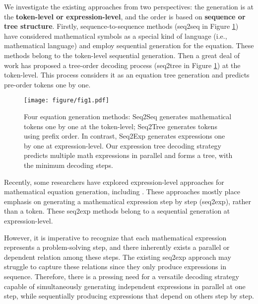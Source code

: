 \documentclass[11pt]{article}
\begin{document}
We investigate the existing approaches from two perspectives: the generation is at the \textbf{token-level or expression-level}, and the order is based on \textbf{sequence or tree structure}. Firstly, sequence-to-sequence methods (seq2seq in Figure \ref{Fig.f1}) \citep{wang2017deep,wang2018translating,chiang-chen-2019-semantically,li-etal-2019-modeling} have considered mathematical symbols as a special kind of language (i.e., mathematical language) and employ sequential generation for the equation. These methods belong to the token-level sequential generation. Then a great deal of work \citep{xie2019goal, zhang2020graph, patel2021nlp,li-etal-2020-graph-tree, HGEN, shen2022seeking} has proposed a tree-order decoding process (seq2tree in Figure \ref{Fig.f1}) at the token-level. This process considers it as an equation tree generation and predicts pre-order tokens one by one.

\begin{figure}[t] \centering \texttt{[image: figure/fig1.pdf]} \caption{Four equation generation methods: Seq2Seq generates mathematical tokens one by one at the token-level; Seq2Tree generates tokens using prefix order. In contrast, Seq2Exp generates expressions one by one at expression-level. Our expression tree decoding strategy predicts multiple math expressions in parallel and forms a tree, with the minimum decoding steps.} \label{Fig.f1} \end{figure}

Recently, some researchers have explored expression-level approaches for mathematical equation generation, including \citep{kim-etal-2020-point, cao2021bottom, jie-etal-2022-learning,zhang2022elastic, zhang-etal-2022-multi-view}. These approaches mostly place emphasis on generating a mathematical expression step by step (seq2exp), rather than a token. These seq2exp methods belong to a sequential generation at expression-level. 



However, it is imperative to recognize that each mathematical expression represents a problem-solving step, and there inherently exists a parallel or dependent relation among these steps. The existing seq2exp approach may struggle to capture these relations since they only produce expressions in sequence. Therefore, there is a pressing need for a versatile decoding strategy capable of simultaneously generating independent expressions in parallel at one step, while sequentially producing expressions that depend on others step by step.
\end{document}
